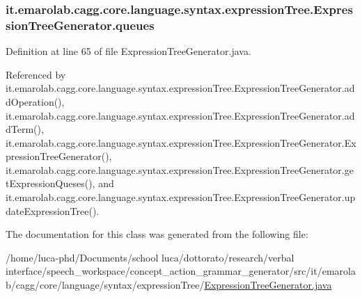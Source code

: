 \hypertarget{classit_1_1emarolab_1_1cagg_1_1core_1_1language_1_1syntax_1_1expressionTree_1_1ExpressionTreeGenerator_aac2440e0163b06ccef97c674673a2236}{
\subsubsection[{queues}]{ it.\-emarolab.\-cagg.\-core.\-language.\-syntax.\-expression\-Tree.\-Expression\-Tree\-Generator.\-queues\hspace{0.3cm}{\ttfamily [private]}}}\label{classit_1_1emarolab_1_1cagg_1_1core_1_1language_1_1syntax_1_1expressionTree_1_1ExpressionTreeGenerator_aac2440e0163b06ccef97c674673a2236}


Definition at line 65 of file Expression\-Tree\-Generator.\-java.



Referenced by it.\-emarolab.\-cagg.\-core.\-language.\-syntax.\-expression\-Tree.\-Expression\-Tree\-Generator.\-add\-Operation(), it.\-emarolab.\-cagg.\-core.\-language.\-syntax.\-expression\-Tree.\-Expression\-Tree\-Generator.\-add\-Term(), it.\-emarolab.\-cagg.\-core.\-language.\-syntax.\-expression\-Tree.\-Expression\-Tree\-Generator.\-Expression\-Tree\-Generator(), it.\-emarolab.\-cagg.\-core.\-language.\-syntax.\-expression\-Tree.\-Expression\-Tree\-Generator.\-get\-Expression\-Queses(), and it.\-emarolab.\-cagg.\-core.\-language.\-syntax.\-expression\-Tree.\-Expression\-Tree\-Generator.\-update\-Expression\-Tree().



The documentation for this class was generated from the following file\-:\begin{DoxyCompactItemize}
\item 
/home/luca-\/phd/\-Documents/school luca/dottorato/research/verbal interface/speech\-\_\-workspace/concept\-\_\-action\-\_\-grammar\-\_\-generator/src/it/emarolab/cagg/core/language/syntax/expression\-Tree/\hyperlink{ExpressionTreeGenerator_8java}{Expression\-Tree\-Generator.\-java}\end{DoxyCompactItemize}
